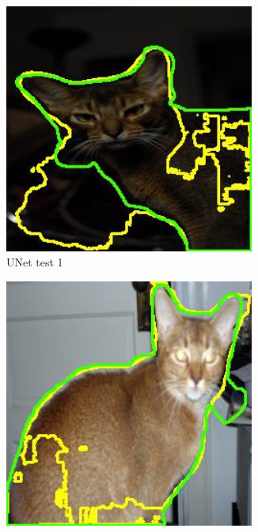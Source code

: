 \documentclass{homework}
\begin{document}
\begin{figure}[H]
    \centering
    \begin{subfigure}{0.20\textwidth}
        \centering
        \includegraphics[width=0.9\textwidth]{Unet_Abyssinian_4.jpg}
        \caption{UNet test 1}
    \end{subfigure}
    \begin{subfigure}{0.20\textwidth}
        \centering
        \includegraphics[width=0.9\textwidth]{Unet_Abyssinian_27.jpg}

\end{subfigure}
\end{figure}
\end{document}
